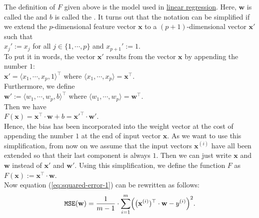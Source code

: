 The definition of $F$ given above is the model used in
\href{https://en.wikipedia.org/wiki/Linear_regression}{linear regression}. 
Here, $\mathbf{w}$ is called the  and $b$ is called the .  It turns
out that the notation can be simplified if we extend the $p$-dimensional feature vector $\mathbf{x}$ to a
$(p+1)$-dimensional vector $\mathbf{x}'$ such that
\\[0.2cm]
\hspace*{1.3cm}
$x_j' := x_j$ \quad for all $j\in\{1,\cdots,p\}$ \quad and \quad $x_{p+1}' := 1$.
\\[0.2cm]
To put it in words, the vector $\mathbf{x}'$ results from the vector $\mathbf{x}$ by appending the number $1$:
\\[0.2cm]
\hspace*{1.3cm}
$\mathbf{x}' = \langle x_1, \cdots, x_p, 1 \rangle^\top$ \quad where $\langle x_1, \cdots, x_p \rangle = \mathbf{x}^\top$.
\\[0.2cm]
Furthermore, we define 
\\[0.2cm]
\hspace*{1.3cm}
$\mathbf{w}' := \langle w_1, \cdots, w_p, b \rangle^\top$ \quad where $\langle w_1, \cdots, w_p \rangle = \mathbf{w}^\top$.
\\[0.2cm]
Then we have
\\[0.2cm]
\hspace*{1.3cm}
$F(\mathbf{x}) = \mathbf{x}^\top \cdot \mathbf{w} + b = \mathbf{x}'^\top \cdot \mathbf{w}'$.
\\[0.2cm]
Hence, the bias has been incorporated into the weight vector at the cost of appending the number $1$ at the end of
input vector $\mathbf{x}$.  As we want to use this simplification, from now on we assume that the input vectors
$\mathbf{x}^{(i)}$ have all been extended so that their last component is always $1$.  Then we can just write
$\mathbf{x}$ and $\mathbf{w}$ instead of $\mathbf{x}'$ and $\mathbf{w}'$.  Using this simplification,  we define the
function $F$ as
\\[0.2cm]
\hspace*{1.3cm}
$F(\mathbf{x}) := \mathbf{x}^\top \cdot \mathbf{w}$.
\\[0.2cm]
Now equation (\ref{eq:squared-error-1}) can be rewritten as follows:
\begin{equation}
  \label{eq:squared-error-2}
  \mathtt{MSE}(\mathbf{w}) = \frac{1}{m-1} \cdot \sum\limits_{i=1}^m \Bigl(\bigl(\mathbf{x}^{(i)})^\top \cdot \mathbf{w}  - y^{(i)}\Bigr)^2.
\end{equation}
